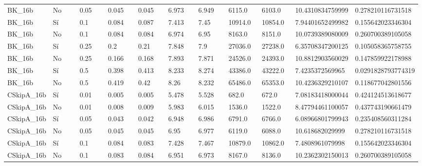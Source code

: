 {{\begin{longtable}{M{0.09\linewidth}M{0.09\linewidth}M{0.09\linewidth}M{0.09\linewidth}M{0.09\linewidth}M{0.09\linewidth}M{0.09\linewidth}M{0.09\linewidth}M{0.09\linewidth}M{0.09\linewidth}M{0.09\linewidth}}
BK\_16b & No & \num{0.05} & \num{0.045} & \num{0.045} & \num{6.973} & \num{6.949} & \num{6115.0} & \num{6103.0} & \num{10.4310834759999} & \num{0.278210116731518} \\
BK\_16b & Sí & \num{0.1} & \num{0.084} & \num{0.087} & \num{7.413} & \num{7.45} & \num{10914.0} & \num{10854.0} & \num{7.94401652499982} & \num{0.155642023346304} \\
BK\_16b & No & \num{0.1} & \num{0.084} & \num{0.084} & \num{6.974} & \num{6.95} & \num{8163.0} & \num{8151.0} & \num{10.0739389080009} & \num{0.260700389105058} \\
BK\_16b & Sí & \num{0.25} & \num{0.2} & \num{0.21} & \num{7.848} & \num{7.9} & \num{27036.0} & \num{27238.0} & \num{6.35708347200125} & \num{0.105058365758755} \\
BK\_16b & No & \num{0.25} & \num{0.166} & \num{0.168} & \num{7.893} & \num{7.871} & \num{24526.0} & \num{24393.0} & \num{10.8812903560029} & \num{0.147859922178988} \\
BK\_16b & Sí & \num{0.5} & \num{0.398} & \num{0.413} & \num{8.233} & \num{8.274} & \num{43386.0} & \num{43222.0} & \num{7.4235372569965} & \num{0.0291828793774319} \\
BK\_16b & No & \num{0.5} & \num{0.419} & \num{0.42} & \num{8.26} & \num{8.232} & \num{65486.0} & \num{65353.0} & \num{10.4236329210107} & \num{0.118677042801556} \\
CSkipA\_16b & Sí & \num{0.01} & \num{0.005} & \num{0.005} & \num{5.478} & \num{5.528} & \num{682.0} & \num{672.0} & \num{7.08183418000044} & \num{0.424124513618677} \\
CSkipA\_16b & No & \num{0.01} & \num{0.008} & \num{0.009} & \num{5.983} & \num{6.015} & \num{1536.0} & \num{1522.0} & \num{8.47794461100057} & \num{0.437743190661479} \\
CSkipA\_16b & Sí & \num{0.05} & \num{0.043} & \num{0.042} & \num{6.948} & \num{6.986} & \num{6791.0} & \num{6766.0} & \num{6.08966801799943} & \num{0.235408560311284} \\
CSkipA\_16b & No & \num{0.05} & \num{0.045} & \num{0.045} & \num{6.95} & \num{6.977} & \num{6119.0} & \num{6088.0} & \num{10.618682029999} & \num{0.278210116731518} \\
CSkipA\_16b & Sí & \num{0.1} & \num{0.084} & \num{0.083} & \num{7.428} & \num{7.467} & \num{10879.0} & \num{10862.0} & \num{7.4808961079998} & \num{0.155642023346304} \\
CSkipA\_16b & No & \num{0.1} & \num{0.083} & \num{0.084} & \num{6.951} & \num{6.973} & \num{8167.0} & \num{8136.0} & \num{10.2362302150013} & \num{0.260700389105058} \\

\end{longtable}}}
